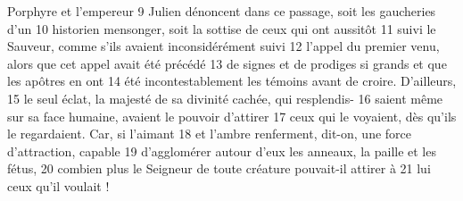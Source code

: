 Porphyre et l'empereur	 
9	 	Julien dénoncent dans ce passage, soit les gaucheries d'un	 
10	 	historien mensonger, soit la sottise de ceux qui ont aussitôt	 
11	 	suivi le Sauveur, comme s'ils avaient inconsidérément suivi	 
12	 	l'appel du premier venu, alors que cet appel avait été précédé	 
13	 	de signes et de prodiges si grands et que les apôtres en ont	 
14	 	été incontestablement les témoins avant de croire. D'ailleurs,	 
15	 	le seul éclat, la majesté de sa divinité cachée, qui resplendis-	 
16	 	saient même sur sa face humaine, avaient le pouvoir d'attirer	 
17	 	ceux qui le voyaient, dès qu'ils le regardaient. Car, si l'aimant	 
18	 	et l'ambre renferment, dit-on, une force d'attraction, capable	 
19	 	d'agglomérer autour d'eux les anneaux, la paille et les fétus,	 
20	 	combien plus le Seigneur de toute créature pouvait-il attirer à	 
21	 	lui ceux qu'il voulait !